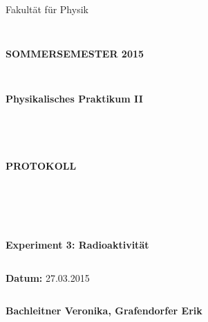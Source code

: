 \documentclass{article}
\begin{document}
\thispagestyle{empty}
			\begin{center}
			\Large{Fakultät für Physik}\\
			\end{center}
\begin{verbatim}


\end{verbatim}
			\begin{center}
			\textbf{\LARGE SOMMERSEMESTER 2015}
			\end{center}
\begin{verbatim}


\end{verbatim}
			\begin{center}
			\textbf{\LARGE{Physikalisches Praktikum II}}
			\end{center}
\begin{verbatim}




\end{verbatim}

			\begin{center}
			\textbf{\LARGE{PROTOKOLL}}
			\end{center}
			
\begin{verbatim}





\end{verbatim}

			\begin{flushleft}
			\textbf{\Large{Experiment 3: Radioaktivität}}\\
			\LARGE{}	
			\end{flushleft}

\begin{verbatim}

\end{verbatim}	
			\begin{flushleft}
			\textbf{\Large{Datum:}} \Large{27.03.2015}
			\end{flushleft}
			
\begin{verbatim}
\end{verbatim}
		\begin{flushleft}
			\textbf{\Large{Bachleitner Veronika, Grafendorfer Erik}} 
			\end{flushleft}
\end{document}
